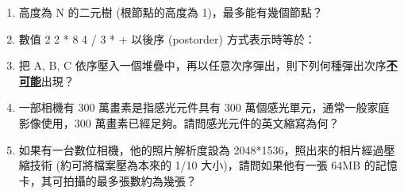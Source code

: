\documentclass[12pt,a4paper]{report}
\begin{document}
\begin{CJK}{UTF8}{bkai}
\begin{enumerate}
\item 高度為 N 的二元樹 (根節點的高度為 1)，最多能有幾個節點？
\item 數值 2 2 * 8 4 / 3 * + 以後序 (postorder) 方式表示時等於：
\item 把 A, B, C 依序壓入一個堆疊中，再以任意次序彈出，則下列何種彈出次序\underline{\textbf{不可能}}出現？
\item 一部相機有 300 萬畫素是指感光元件具有 300 萬個感光單元，通常一般家庭影像使用，300 萬畫素已經足夠。請問感光元件的英文縮寫為何？
\item 如果有一台數位相機，他的照片解析度設為 2048*1536，照出來的相片經過壓縮技術 (約可將檔案壓為本來的 1/10 大小)，請問如果他有一張 64MB 的記憶卡，其可拍攝的最多張數約為幾張？

\end{enumerate}
\end{CJK}
\end{document}

